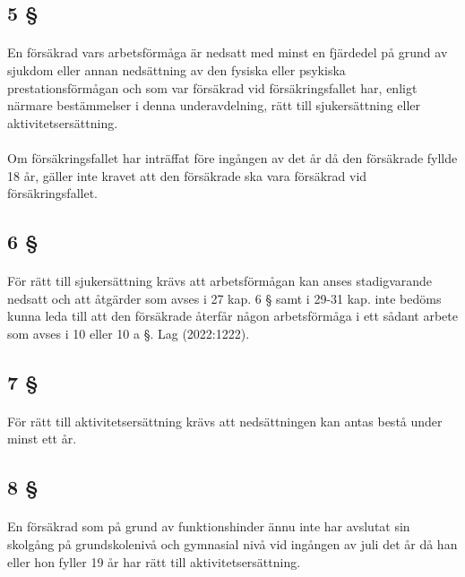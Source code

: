 \documentclass[a4paper,notitlepage,openany,10pt]{book}
\begin{document}
\subsection*{5 §}
\paragraph*{}
En försäkrad vars arbetsförmåga är nedsatt med minst en fjärdedel på grund av sjukdom eller annan nedsättning av den fysiska eller psykiska prestationsförmågan och som var försäkrad vid försäkringsfallet har, enligt närmare bestämmelser i denna underavdelning, rätt till sjukersättning eller aktivitetsersättning.
\paragraph*{}
Om försäkringsfallet har inträffat före ingången av det år då den försäkrade fyllde 18 år, gäller inte kravet att den försäkrade ska vara försäkrad vid försäkringsfallet.
\subsection*{6 §}
\paragraph*{}
För rätt till sjukersättning krävs att arbetsförmågan kan anses stadigvarande nedsatt och att åtgärder som avses i 27 kap. 6 § samt i 29-31 kap. inte bedöms kunna leda till att den försäkrade återfår någon arbetsförmåga i ett sådant arbete som avses i 10 eller 10 a §.
Lag (2022:1222).
\subsection*{7 §}
\paragraph*{}
För rätt till aktivitetsersättning krävs att nedsättningen kan antas bestå under minst ett år.
\subsection*{8 §}
\paragraph*{}
En försäkrad som på grund av funktionshinder ännu inte har avslutat sin skolgång på grundskolenivå och gymnasial nivå vid ingången av juli det år då han eller hon fyller 19 år har rätt till aktivitetsersättning.
\end{document}

